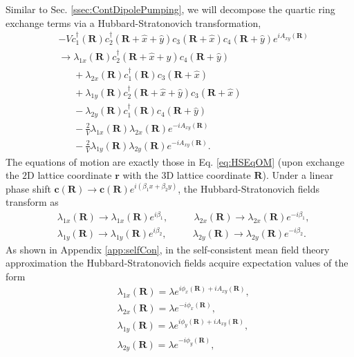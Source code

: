 \documentclass[prb,aps,twocolumn,groupaddress,floatfix]{revtex4-1}
\begin{document}
Similar to Sec. \ref{ssec:ContDipolePumping}, we will decompose the quartic ring exchange terms via a Hubbard-Stratonovich transformation,
\begin{equation}
\begin{split}
&-V c_1^\dagger(\bm{R})c_2^\dagger(\bm{R}+\hat{x}+\hat{y})c_3(\bm{R}+\hat{x})c_4(\bm{R}+\hat{y})e^{iA_{xy}(\bm{R})} \\ &\rightarrow \lambda_{1x}(\bm{R})c_2^\dagger(\bm{R}+\hat{x}+\hat{y})c_4(\bm{R}+\hat{y})\\ &\phantom{\rightarrow}+ \lambda_{2x}(\bm{R}) c_1^\dagger(\bm{R})c_3(\bm{R}+\hat{x}) \\&\phantom{\rightarrow}+\lambda_{1y}(\bm{R})c_2^\dagger(\bm{R}+\hat{x}+\hat{y})c_3(\bm{R}+\hat{x})\\ &\phantom{\rightarrow}- \lambda_{2y}(\bm{R})c_1^\dagger(\bm{R})c_4(\bm{R}+\hat{y})\\ &\phantom{\rightarrow}- \frac{2}{V}\lambda_{1x}(\bm{R})\lambda_{2x}(\bm{R})e^{-iA_{xy}(\bm{R})}\\ &\phantom{\rightarrow} - \frac{2}{V}\lambda_{1y}(\bm{R})\lambda_{2y}(\bm{R})e^{-iA_{xy}(\bm{R})}. 
\end{split}\label{eq:LatticeHS3D}
\end{equation}
The equations of motion are exactly those in Eq. \ref{eq:HSEqOM} (upon exchange the $2$D lattice coordinate $\bm{r}$ with the $3$D lattice coordinate $\bm{R}$). Under a linear phase shift $\bm{c}(\bm{R})\rightarrow \bm{c}(\bm{R}) e^{ i (\beta_1 x + \beta_2 y )}$, the Hubbard-Stratonovich fields transform as
\begin{equation}
\begin{split}
& \lambda_{1x}(\bm{R})\rightarrow \lambda_{1x}(\bm{R})e^{i\beta_1}, \phantom{==} \lambda_{2x}(\bm{R})\rightarrow \lambda_{2x}(\bm{R})e^{-i\beta_1},\\ 
&\lambda_{1y}(\bm{R})\rightarrow \lambda_{1y}(\bm{R})e^{i\beta_2}, \phantom{==} \lambda_{2y}(\bm{R})\rightarrow \lambda_{2y}(\bm{R})e^{-i\beta_2}.
\end{split}\label{eq:HSLinearTransformation2}
\end{equation}
As shown in Appendix \ref{app:selfCon}, in the self-consistent mean field theory approximation the Hubbard-Stratonovich fields acquire expectation values of the form
\begin{equation}
\begin{split}
&\lambda_{1x}(\bm{R})=  \lambda e^{i\phi_x(\bm{R})+iA_{xy}(\bm{R})},\\
&\lambda_{2x}(\bm{R})=  \lambda e^{-i\phi_x(\bm{R})},\\
&\lambda_{1y}(\bm{R})=  \lambda e^{i\phi_y(\bm{R})+iA_{xy}(\bm{R})},\\
&\lambda_{2y}(\bm{R})=  \lambda e^{-i\phi_y(\bm{R})},
\end{split}\label{eq:HSSelfConsistent3DC}
\end{equation}
\end{document}
